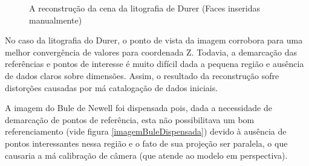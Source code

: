 			\begin{figure}[!htb]
				\centering
				\quad
				\quad
				\caption{A reconstrução da cena da litografia de Durer (Faces inseridas manualmente)}
				\label{resultadosDurerTriplo}
			\end{figure}
			
			No caso da litografia do Durer, o ponto de vista da imagem corrobora para uma melhor convergência de valores para coordenada Z. Todavia, a demarcação das referências e pontos de interesse é muito difícil dada a pequena região e ausência de dados claros sobre dimensões. Assim, o resultado da reconstrução sofre distorções causadas por má catalogação de dados iniciais.
			
			A imagem do Bule de Newell foi dispensada pois, dada a necessidade de demarcação de pontos de referência, esta não possibilitava um bom referenciamento (vide figura \ref{imagemBuleDispensada}) devido à ausência de pontos interessantes nessa região e o fato de sua projeção ser paralela, o que causaria a má calibração de câmera (que atende ao modelo em perspectiva).
			

